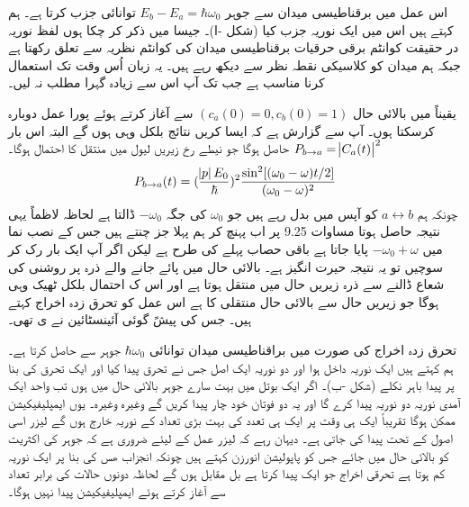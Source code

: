 اس عمل میں برقناطیسی میدان سے جوہر \(E_b - E_a = \hbar\omega_0\) توانائی جزب کرتا ہے۔ ہم کہتے ہیں اس میں ایک نوریہ جزب کیا (شکل -ا)۔  جیسا میں ذکر کر چکا ہوں لفظ نوریہ در حقیقت کوانٹم برقی حرقیات برقناطیسی میدان کی کوانٹم نظریہ سے تعلق رکھتا ہے جبکہ ہم میدان کو کلاسیکی نقطہ نظر سے دیکھ رہے ہیں۔ یہ زبان اُس وقت تک استعمال کرنا مناسب ہے جب تک آپ اس سے زیادہ گہرا مطلب نہ لیں۔

یقیناً میں بالائی حال \((c_a(0)=0, c_b(0)=1)\) سے آغاز کرتے ہوئے پورا عمل دوبارہ کرسکتا ہوں۔ آپ سے گزارش ہے کہ ایسا کریں نتائج بلکل وہی ہوں گے البتہ اس بار \(P_{b\rightarrow a} = \abs{C_a(t)}^2\) حاصل ہوگا جو نیطے رخ زیریں لیول میں منتقل کا احتمال ہوگا۔
\begin{align}
	P_{b\rightarrow a} (t) = (\frac{\abs{p}E_0}{\hbar})^2 \frac{\sin^2[(\omega_0 - \omega)t/2]}{(\omega_0 - \omega)^2}
\end{align}
چونکہ ہم \(a\leftrightarrow b\) کو آپس میں بدل رہے ہیں جو \(\omega_0\) کی جگہ \(-\omega_0\) ڈالتا ہے لحاظہ لاظماً یہی نتیجہ حاصل ہوتا مساوات \num{9.25} پر اب پہنچ کر ہم پہلا جز چنتے ہیں جس کے نصب نما میں \(-\omega_0 + \omega\) پایا جاتا ہے باقی حصاب پہلے کی طرح ہے لیکن اگر آپ ایک بار رک کر سوچیں تو یہ نتیجہ حیرت انگیز ہے۔ بالائی حال میں پائے جانے والے ذرہ پر روشنی کی شعاع ڈالنے سے ذرہ زیریں حال میں منتقل ہوتا ہے اور اس ک احتمال بلکل ٹھیک وہی ہوگا جو زیریں حال سے بالائی حال منتقلی کا ہے اس عمل کو تحرق زدہ اخراج کہتے ہیں۔ جس کی پیشً گوئی آئینسٹائین نے ی تھی۔

تحرق زدہ اخراج کی صورت میں براقناطیسی میدان توانائی \(\hbar\omega_0\) جوہر سے حاصل کرتا ہے۔ ہم کہتے ہیں ایک نوریہ داخل ہوا اور دو نوریہ ایک اصل جس نے تحرق پیدا کیا اور ایک تحرق کی بنا پر پیدا باہر نکلے   (شکل -ب)۔ اگر ایک بوتل میں بہت سارے جوہر بالائی حال میں ہوں تب واحد ایک آمدی نوریہ دو نوریہ پیدا کرے گا اور یہ دو فوتان خود چار پیدا کریں گے وغیرہ وغیرہ۔ یوں ایمپلیفیکیشن ممکن ہوگا تقریباً ایک ہی وقت پر ایک ہی تعدد کی بہت بڑی تعداد کے نوریہ خارج ہوں گے لیزر اسی اصول کے تحت پیدا کی جاتی ہے۔ دیہان رہے کہ لیزر عمل کے لیئے ضروری ہے کہ جوہر کی اکثریت کو بالائی حال میں جائے جس کو پاپولیشن انورزن کہتے ہیں چونکہ انجزاب ھس کی بنا پر ایک نوریہ کم ہوتا ہے تحرقی اخراج جو ایک پیدا کرتا ہے بل مقابل ہوں گے لحاظہ دونوں حالات کی برابر تعداد سے آغاز کرتے ہوئے ایمپلیفیکیشن پیدا نہیں ہوگا۔

